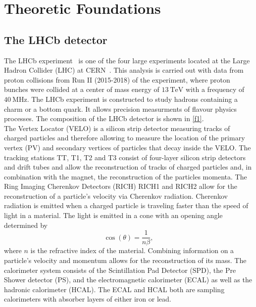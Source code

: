\section{Theoretic Foundations}
\label{sec:Theorie}

\subsection{The LHCb detector}

The LHCb experiment~\cite{Collaboration_2008} is one of the four large experiments located at the Large Hadron Collider (LHC) at CERN~\cite{Evans_2008}.
This analysis is carried out with data from proton collisions from Run II (2015-2018) of the experiment, where proton bunches were collided at
a center of mass energy of $\SI{13}{\tera\eV}$ with a frequency of $\SI{40}{\mega\hertz}$. The LHCb experiment is constructed to study hadrons
containing a charm or a bottom quark. It allows precision measurments of flavour physics processes.
The composition of the LHCb detector is shown in \autoref{f1}. \\
The Vertex Locator (VELO) is a silicon strip detector measuring tracks of charged particles and therefore allowing to measure the location of the
primary vertex (PV) and secondary vertices of particles that decay inside the VELO. The tracking stations TT, T1, T2 and T3 consist of four-layer silicon
strip detectors and drift tubes and allow the reconstruction of tracks of charged particles and, in combination with the magnet, the reconstruction of the
particles momenta.
The Ring Imaging Cherenkov Detectors (RICH) RICH1 and RICH2 allow for the reconstruction of a particle's velocity via Cherenkov radiation.
Cherenkov radiation is emitted when a charged particle is traveling faster than the speed of light in a material. The light is emitted in a cone with an opening angle determined by
\begin{equation*}
  \cos (\theta) = \frac{1}{n \beta},
\end{equation*}
where $n$ is the refractive index of the material.
Combining information on a particle's velocity and momentum allows for the reconstruction of its mass.
The calorimeter system consists of the Scintillation Pad Detector (SPD), the Pre Shower detector (PS), and the electromagnetic calorimeter (ECAL)
as well as the hadronic calorimeter (HCAL). The ECAL and HCAL both are sampling calorimeters with absorber layers of either iron or lead.
